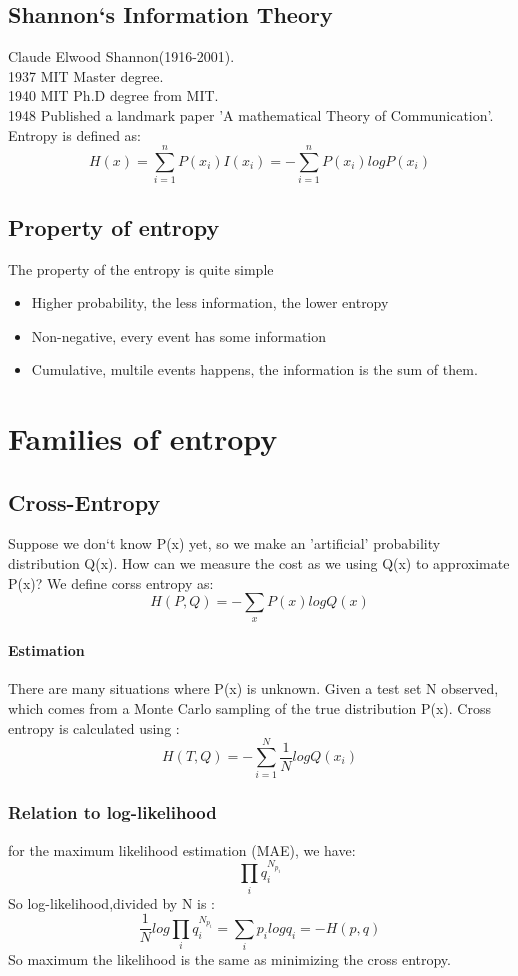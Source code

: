 \documentclass{article}
\begin{document}
\subsection{Shannon`s Information Theory}
Claude Elwood Shannon(1916-2001).\\
1937 MIT Master degree.\\
1940 MIT Ph.D degree from MIT. \\
1948 Published a landmark paper 'A mathematical Theory of Communication'.\\
Entropy is defined as:
$$H(x)=\sum_{i=1}^{n}P(x_{i})I(x_{i})=-\sum_{i=1}^{n}P(x_{i})logP(x_{i})$$
\subsection{Property of entropy}
The property of the entropy is quite simple
\begin{itemize}
\item Higher probability, the less information, the lower entropy
\item Non-negative, every event has some information
\item Cumulative, multile events happens, the information is the sum of them.
\end{itemize}
\section{Families of entropy}
\subsection{Cross-Entropy}
Suppose we don`t know P(x) yet, so we make an 'artificial' probability distribution Q(x). How can we measure the cost as we using Q(x) to approximate P(x)? We define corss entropy as:
$$H(P,Q)=-\sum_{x}P(x)logQ(x)$$

\paragraph{Estimation} There are many situations where P(x) is unknown. Given a test set N observed, which comes from a Monte Carlo sampling of the true distribution P(x). Cross entropy is calculated using :
$$H(T,Q)=-\sum_{i=1}^{N}\frac{1}{N}logQ(x_{i})$$
\subsubsection{Relation to log-likelihood}
for the maximum likelihood estimation (MAE), we have:
$$\prod_{i}q_{i}^{N_{p_{i}}}$$
So log-likelihood,divided by N is :
$$\frac{1}{N}log\prod_{i}q_{i}^{N_{p_{i}}}=\sum_{i}p_{i}logq_{i}=-H(p,q)$$
So maximum the likelihood is the same as minimizing the cross entropy.
\end{document}
